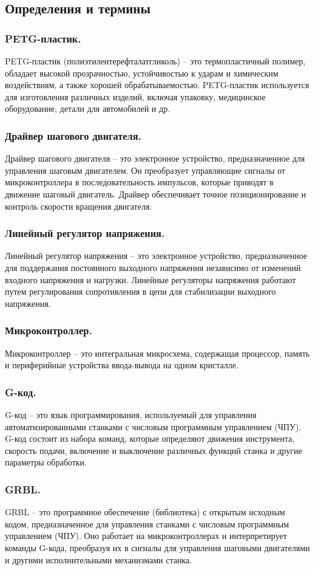 \subsection{Определения и термины}

\subsubsection{PETG-пластик.} PETG-пластик (полиэтилентерефталатгликоль) -- это термопластичный полимер, обладает высокой прозрачностью, устойчивостью к ударам 
и химическим воздействиям, а также хорошей обрабатываемостью. PETG-пластик используется для изготовления различных изделий, 
включая упаковку, медицинское оборудование, детали для автомобилей и др. 

\subsubsection{Драйвер шагового двигателя.} Драйвер шагового двигателя -- это электронное устройство, предназначенное для управления шаговым двигателем. 
Он преобразует управляющие сигналы от микроконтроллера в последовательность импульсов, которые приводят в движение шаговый двигатель. 
Драйвер обеспечивает точное позиционирование и контроль скорости вращения двигателя.

\subsubsection{Линейный регулятор напряжения.} Линейный регулятор напряжения -- это электронное устройство, предназначенное для поддержания постоянного выходного напряжения 
независимо от изменений входного напряжения и нагрузки. Линейные регуляторы напряжения работают путем регулирования сопротивления 
в цепи для стабилизации выходного напряжения. 

\subsubsection{Микроконтроллер.} Микроконтроллер -- это интегральная микросхема, содержащая процессор, память и периферийные устройства ввода-вывода на одном кристалле.

\subsubsection{G-код.} G-код -- это язык программирования, используемый для управления автоматизированными станками с числовым программным управлением (ЧПУ). 
G-код состоит из набора команд, которые определяют движения инструмента, скорость подачи, включение и выключение различных функций 
станка и другие параметры обработки. 

\subsubsection{GRBL.} GRBL -- это программное обеспечение (библиотека) с открытым исходным кодом, предназначенное для управления станками с числовым программным 
управлением (ЧПУ). Оно работает на микроконтроллерах и интерпретирует команды G-кода, преобразуя их в сигналы для управления шаговыми двигателями 
и другими исполнительными механизмами станка. 